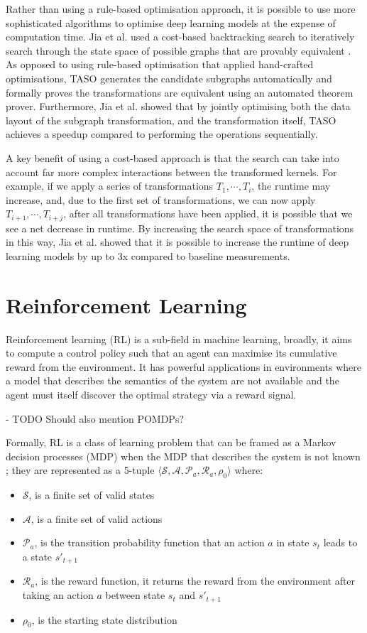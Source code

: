 Rather than using a rule-based optimisation approach, it is possible to use more sophisticated algorithms to optimise deep learning models at the expense of computation time. Jia et al. used a cost-based backtracking search to iteratively search through the state space of possible graphs that are provably equivalent \cite{jia2019taso}. As opposed to using rule-based optimisation that applied hand-crafted optimisations, TASO generates the candidate subgraphs automatically and formally proves the transformations are equivalent using an automated theorem prover. Furthermore, Jia et al. showed that by jointly optimising both the data layout of the subgraph transformation, and the transformation itself, TASO achieves a speedup compared to performing the operations sequentially.

A key benefit of using a cost-based approach is that the search can take into account far more complex interactions between the transformed kernels. For example, if we apply a series of transformations $T_1, \cdots, T_i$, the runtime may increase, and, due to the first set of transformations, we can now apply $T_{i + 1}, \cdots, T_{i + j}$, after all transformations have been applied, it is possible that we see a net decrease in runtime. By increasing the search space of transformations in this way, Jia et al. showed that it is possible to increase the runtime of deep learning models by up to 3x \cite{jia2019taso, jia2019optimizing} compared to baseline measurements.


\section{Reinforcement Learning}
Reinforcement learning (RL) is a sub-field in machine learning, broadly, it aims to compute a control policy such that an agent can maximise its cumulative reward from the environment. It has powerful applications in environments where a model that describes the semantics of the system are not available and the agent must itself discover the optimal strategy via a reward signal.

- TODO Should also mention POMDPs?

Formally, RL is a class of learning problem that can be framed as a Markov decision processes (MDP) when the MDP that describes the system is not known \cite{bellman1957}; they are represented as a 5-tuple $\langle \mathcal{S}, \mathcal{A}, \mathcal{P}_a, \mathcal{R}_a, \rho_0 \rangle$ where:

\begin{itemize}
  \item $\mathcal{S}$, is a finite set of valid states
  \item $\mathcal{A}$, is a finite set of valid actions
  \item $\mathcal{P}_a$, is the transition probability function that an action $a$ in state $s_t$ leads to a state $s'_{t+1}$
  \item $\mathcal{R}_a$, is the reward function, it returns the reward from the environment after taking an action $a$ between state $s_t$ and $s'_{t+1}$
  \item $\rho_0$, is the starting state distribution
\end{itemize}

